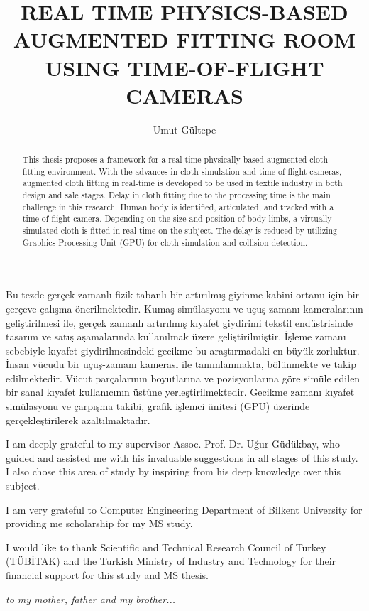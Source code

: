 \documentclass{buthesis}
\title{REAL TIME PHYSICS-BASED AUGMENTED FITTING ROOM USING TIME-OF-FLIGHT CAMERAS}
\author{Umut G{\"u}ltepe}
\begin{document}
\titlepageMS
\signaturepageMS
\begin{abstract}
\indent This thesis proposes a framework for a real-time physically-based augmented cloth fitting environment. With the advances in cloth simulation and time-of-flight cameras, augmented cloth fitting in real-time is developed to be used in textile industry in both design and sale stages. Delay in cloth fitting due to the processing time is the main challenge in this research. Human body is identified, articulated, and tracked with a time-of-flight camera. Depending on the size and position of body limbs, 
a virtually simulated cloth is fitted in real time on the subject. The delay is reduced by utilizing Graphics Processing Unit (GPU)  for cloth simulation and collision detection.
\end{abstract}



\begin{ozet}
\indent Bu tezde ger\c{c}ek zamanl{\i} fizik tabanl{\i} bir art{\i}r{\i}lm{\i}\c{s} giyinme kabini ortam{\i} i\c{c}in bir \c{c}er\c{c}eve \c{c}al{\i}\c{s}ma {\"o}nerilmektedir. Kuma\c{s} sim{\"u}lasyonu ve u\c{c}u\c{s}-zaman{\i} kameralar{\i}n{\i}n geli\c{s}tirilmesi ile, ger\c{c}ek zamanl{\i} art{\i}r{\i}lm{\i}\c{s} k{\i}yafet giydirimi tekstil end{\"u}strisinde tasar{\i}m ve sat{\i}\c{s} a\c{s}amalar{\i}nda kullan{\i}lmak {\"u}zere geli\c{s}tirilmi\c{s}tir. \.{I}\c{s}leme zaman{\i} sebebiyle k{\i}yafet giydirilmesindeki gecikme bu ara\c{s}t{\i}rmadaki en b{\"u}y{\"u}k zorluktur. \.{I}nsan v{\"u}cudu bir u\c{c}u\c{s}-zaman{\i} kameras{\i} ile tan{\i}mlanmakta, b{\"o}l{\"u}nmekte ve takip edilmektedir. V{\"u}cut par\c{c}alar{\i}n{\i}n boyutlar{\i}na ve pozisyonlar{\i}na g{\"o}re sim{\"u}le edilen bir sanal k{\i}yafet kullan{\i}c{\i}n{\i}n {\"u}st{\"u}ne yerle\c{s}tirilmektedir. Gecikme zaman{\i} k{\i}yafet sim{\"u}lasyonu ve \c{c}arp{\i}\c{s}ma takibi, grafik i\c{s}lemci \"{u}nitesi (GPU) {\"u}zerinde ger\c{c}ekle\c{s}tirilerek azalt{\i}lmaktad{\i}r.  
\end{ozet}

\begin{ack}

I am deeply grateful to my supervisor Assoc. Prof. Dr. U\u{g}ur G{\"u}d{\"u}kbay, who guided and assisted me with his invaluable suggestions in all stages of this study. I also chose this area of study by inspiring from his deep knowledge over this subject.

I am very grateful to Computer Engineering Department of Bilkent University for providing me scholarship for my MS study. 

I would like to thank Scientific and Technical Research Council of Turkey (T{\"U}B\.{I}TAK) and the Turkish Ministry of Industry and Technology for their financial support for this study and MS thesis.

\end{ack}

\newpage
\setcounter{page}{5}
\vspace*{5cm}
\begin{center}
{\large \it to my mother, father and my brother...}
\end{center}

\tableofcontents
\listoffigures
\listoftables
\listofalgorithms
\newpage
\newpage
%
\newpage
\pagestyle{headings}
\makeatother
\end{document}
